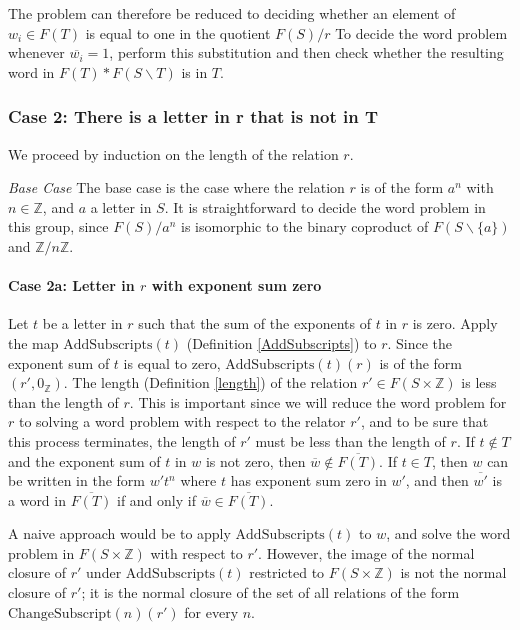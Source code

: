 \documentclass[12pt]{article} %
\theoremstyle{definition}
\theoremstyle{definition}
\theoremstyle{definition}
\theoremstyle{definition}
\begin{document}
The problem can therefore be reduced to deciding whether an element of
$w_i \in F(T)$ is equal to one in the quotient $F(S) /r$
To decide the word problem whenever $\overline{w_i} = 1$, perform this substitution and
then check whether the resulting word in $F(T) \ast F(S \backslash T)$ is in $T$.

\subsubsection{Case 2: There is a letter in r that is not in T}\label{xandt}

We proceed by induction on the length of the relation $r$.

\textit{Base Case} \newline
The base case is the case where the relation $r$ is of the form $a^n$ with
$n \in \mathbb{Z}$, and $a$ a letter in $S$. It is straightforward to decide
the word problem in this group, since $F(S) / a^n$ is isomorphic
to the binary coproduct of $F(S \backslash \{a\})$ and $\mathbb{Z}/n\mathbb{Z}$.

\paragraph{Case 2a: Letter in $r$ with exponent sum zero}\label{expsumzero}

Let $t$ be a letter in $r$ such that the sum of the exponents of $t$
in $r$ is zero.
Apply the map $\text{AddSubscripts}(t)$ (Definition \ref{AddSubscripts}) to $r$.
Since the exponent sum of $t$ is equal to zero, $\text{AddSubscripts}(t)(r)$ is
of the form $(r', 0_\mathbb{Z})$.
The length (Definition \ref{length}) of the relation $r' \in F(S \times \mathbb{Z})$
is less than the length of $r$. This is important since we will reduce the word problem
for $r$ to solving a word problem with respect to the relator $r'$,
and to be sure that this process terminates,
the length of $r'$ must be less than the length of $r$.
If $t \notin T$ and the exponent sum of $t$ in $w$ is not zero,
then $\overline{w} \notin \overline{F(T)}$.
If $t \in T$, then $w$ can be written in the
form $w' t^n$ where $t$ has exponent sum zero in $w'$,
and then $\overline{w'}$ is a word in $\overline{F(T)}$ if
and only if $\overline{w} \in \overline{F(T)}$.

A naive approach would be to apply $\text{AddSubscripts}(t)$ to $w$, and solve the word
problem in $F(S \times \mathbb{Z})$ with respect to $r'$.
However, the image of the normal closure of $r'$ under $\text{AddSubscripts}(t)$ restricted
to $F(S \times \mathbb{Z})$ is not the normal closure of $r'$; it is the normal closure of
the set of all relations of the form $\text{ChangeSubscript}(n)(r')$ for every $n$.
\end{document}

